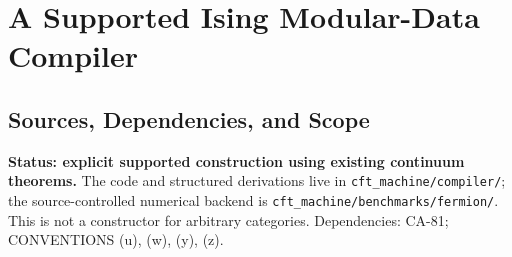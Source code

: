 
\section{A Supported Ising Modular-Data Compiler}
\label{sec:ising-modular-compiler}

\subsection{Sources, Dependencies, and Scope}

\textbf{Status: explicit supported construction using existing continuum
theorems.} The code and structured derivations live in
\texttt{cft\_machine/compiler/}; the source-controlled numerical backend
is \texttt{cft\_machine/benchmarks/fermion/}. This is not a constructor
for arbitrary categories. Dependencies: CA-81; CONVENTIONS (u), (w), (y), (z).


